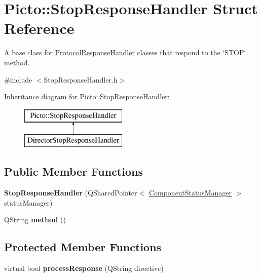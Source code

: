 \hypertarget{struct_picto_1_1_stop_response_handler}{\section{Picto\-:\-:Stop\-Response\-Handler Struct Reference}
\label{struct_picto_1_1_stop_response_handler}
}


A base class for \hyperlink{struct_picto_1_1_protocol_response_handler}{Protocol\-Response\-Handler} classes that respond to the \char`\"{}\-S\-T\-O\-P\char`\"{} method.  




{\ttfamily \#include $<$Stop\-Response\-Handler.\-h$>$}

Inheritance diagram for Picto\-:\-:Stop\-Response\-Handler\-:\begin{figure}[H]
\begin{center}
\leavevmode
\includegraphics[height=2.000000cm]{struct_picto_1_1_stop_response_handler}
\end{center}
\end{figure}
\subsection*{Public Member Functions}
\begin{DoxyCompactItemize}
\item 
\hypertarget{struct_picto_1_1_stop_response_handler_a30952dad3b521c478dfb5f6dbe9371b9}{{\bfseries Stop\-Response\-Handler} (Q\-Shared\-Pointer$<$ \hyperlink{class_component_status_manager}{Component\-Status\-Manager} $>$ status\-Manager)}\label{struct_picto_1_1_stop_response_handler_a30952dad3b521c478dfb5f6dbe9371b9}

\item 
\hypertarget{struct_picto_1_1_stop_response_handler_aa16178692e2b0476f1d9301f91f2a604}{Q\-String {\bfseries method} ()}\label{struct_picto_1_1_stop_response_handler_aa16178692e2b0476f1d9301f91f2a604}

\end{DoxyCompactItemize}
\subsection*{Protected Member Functions}
\begin{DoxyCompactItemize}
\item 
\hypertarget{struct_picto_1_1_stop_response_handler_a4d2327c66058bd3b353dd95f0fefd492}{virtual bool {\bfseries process\-Response} (Q\-String directive)}\label{struct_picto_1_1_stop_response_handler_a4d2327c66058bd3b353dd95f0fefd492}

\end{DoxyCompactItemize}



